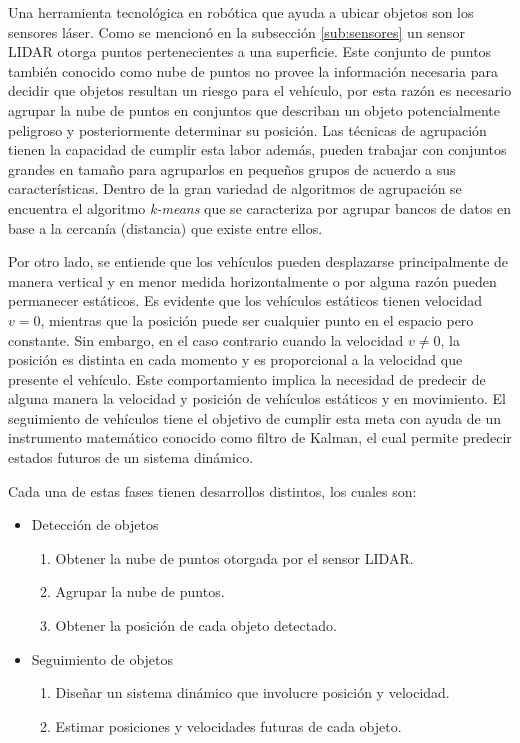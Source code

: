 Una herramienta tecnológica en robótica que ayuda a ubicar objetos son los sensores láser. Como se mencionó en la subsección \ref{sub:sensores} un sensor LIDAR otorga puntos pertenecientes a una superficie. Este conjunto de puntos también conocido como nube de puntos no provee la información necesaria para decidir que objetos resultan un riesgo para el vehículo, por esta razón es necesario agrupar la nube de puntos en conjuntos que describan un objeto potencialmente peligroso y posteriormente determinar su posición. Las técnicas de agrupación tienen la capacidad de cumplir esta labor además, pueden trabajar con conjuntos grandes en tamaño para agruparlos en pequeños grupos de acuerdo a sus características. Dentro de la gran variedad de algoritmos de agrupación se encuentra el algoritmo \textit{k-means} que se caracteriza por agrupar bancos de datos en base a la cercanía (distancia) que existe entre ellos. 

Por otro lado, se entiende que los vehículos pueden desplazarse principalmente de manera vertical y en menor medida horizontalmente o por alguna razón pueden permanecer estáticos. Es evidente que los vehículos estáticos tienen velocidad $v = 0$,  mientras que la posición puede ser cualquier punto en el espacio pero constante. Sin embargo, en el caso contrario cuando la velocidad $v \neq 0$, la posición es distinta en cada momento y es proporcional a la velocidad que presente el vehículo. Este comportamiento implica la necesidad de predecir de alguna manera la velocidad y posición de vehículos estáticos y en movimiento. El seguimiento de vehículos tiene el objetivo de cumplir esta meta con ayuda de un instrumento matemático conocido como filtro de Kalman, el cual permite predecir estados futuros de un sistema dinámico.

Cada una de estas fases tienen desarrollos distintos, los cuales son:
\begin{itemize}
    \item Detección de objetos
        \begin{enumerate}
            \item Obtener la nube de puntos otorgada por el sensor LIDAR.
            \item Agrupar la nube de puntos.
            \item Obtener la posición de cada objeto detectado.
        \end{enumerate}
    \item Seguimiento de objetos
    \begin{enumerate}
        \item Diseñar un sistema dinámico que involucre posición y velocidad.
        \item Estimar posiciones y velocidades futuras de cada objeto.
    \end{enumerate}
\end{itemize}

